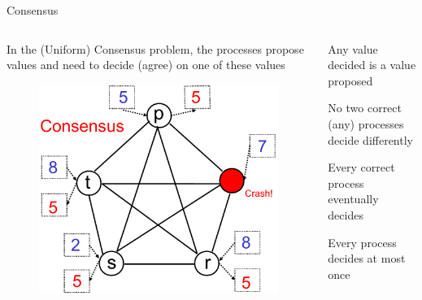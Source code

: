 \begin{frame}{Consensus}
	
\begin{columns}
	
\begin{column}{0.45\textwidth}
In the \alert{(Uniform) Consensus} problem, the processes \alert{propose}
values and need to \alert{decide} (agree) on one of these values
\begin{figure}
\includegraphics[width=\textwidth]{rb-consensus}
\end{figure}

\end{column}

\begin{column}{0.55\textwidth}
\begin{definition}
Any value decided is a value proposed
\end{definition} 
\begin{definition}
No two correct (any) processes decide differently 
\end{definition} 
\begin{definition}[Termination]
Every correct process eventually decides
\end{definition} 
\begin{definition}
Every process decides at most once
\end{definition} 
\end{column}
\end{columns}

	
\end{frame}

